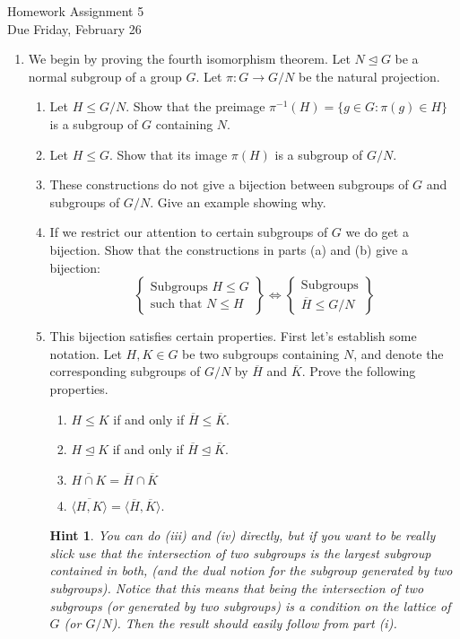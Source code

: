 \documentclass[11pt]{article}
\newtheorem*{hint}{Hint}
\begin{document}
\begin{center}
\Large {Homework Assignment 5}\\
\small {Due Friday, February 26}
\end{center}
\begin{enumerate}
  \item{
  We begin by proving the fourth isomorphism theorem.  Let $N\unlhd G$ be a normal subgroup of a group $G$.  Let $\pi:G\to G/N$ be the natural projection.
  \begin{enumerate}
    \item Let $H\le G/N$.  Show that the preimage $\pi^{-1}(H) = \{g\in G:\pi(g)\in H\}$ is a subgroup of $G$ containing $N$.
    \item Let $H\le G$.  Show that its image $\pi(H)$ is a subgroup of $G/N$.
    \item These constructions do not give a bijection between subgroups of $G$ and subgroups of $G/N$.  Give an example showing why.
    \item If we restrict our attention to certain subgroups of $G$ we do get a bijection.  Show that the constructions in parts (a) and (b) give a bijection:
    \[\left\{
    \begin{array}{c}
      \text{Subgroups }H\le G\\
      \text{such that }N\le H
    \end{array}\right\}
    \Longleftrightarrow
    \left\{
    \begin{array}{c}
      \text{Subgroups}\\
      \overline{H}\le G/N
    \end{array}
    \right\}
    \]
  \item This bijection satisfies certain properties.  First let's establish some notation. Let $H,K\in G$ be two subgroups containing $N$, and denote the corresponding subgroups of $G/N$ by $\overline H$ and $\overline K$.  Prove the following properties.
    \begin{enumerate}
      \item $H\le K$ if and only if $\overline H\le\overline K$.
      \item $H\unlhd K$ if and only if $\overline H\unlhd\overline K$.
      \item $\overline{H\cap K} = \overline H\cap\overline K$
      \item $\overline{\langle H,K\rangle} = \langle\overline H,\overline K\rangle$.
    \end{enumerate}
    \begin{hint}
      You can do (iii) and (iv) directly, but if you want to be really slick use that the intersection of two subgroups is the largest subgroup contained in both, (and the dual notion for the subgroup generated by two subgroups).  Notice that this means that being the intersection of two subgroups (or generated by two subgroups) is a condition on the lattice of $G$ (or $G/N$).  Then the result should easily follow from part (i).
    \end{hint}
  \end{enumerate}
  }
\end{enumerate}
\end{document}
